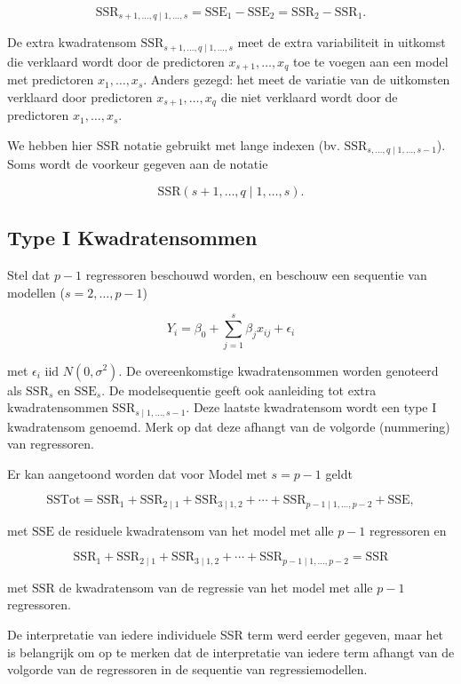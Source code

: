 \documentclass[
  dutch,
  letterpaper,
  12pt]{book}
\theoremstyle{definition}
\theoremstyle{definition}
\theoremstyle{definition}
\theoremstyle{remark}
\begin{document}
\[
  \text{SSR}_{s+1, \ldots, q\mid 1,\ldots, s} = \text{SSE}_1-\text{SSE}_2=\text{SSR}_2-\text{SSR}_1.
\]

De extra kwadratensom \(\text{SSR}_{s+1, \ldots, q\mid 1,\ldots, s}\)
meet de extra variabiliteit in uitkomst die verklaard wordt door de
predictoren \(x_{s+1}, \ldots, x_q\) toe te voegen aan een model met
predictoren \(x_1,\ldots, x_{s}\). Anders gezegd: het meet de variatie
van de uitkomsten verklaard door predictoren \(x_{s+1}, \ldots, x_q\)
die niet verklaard wordt door de predictoren \(x_1,\ldots, x_{s}\).

We hebben hier SSR notatie gebruikt met lange indexen (bv.
\(\text{SSR}_{s, \ldots, q\mid 1,\ldots, s-1}\)). Soms wordt de voorkeur
gegeven aan de notatie

\[
  \text{SSR}(s+1, \ldots, q\mid 1,\ldots, s).
\]

\subsection{Type I Kwadratensommen}\label{type-i-kwadratensommen}

Stel dat \(p-1\) regressoren beschouwd worden, en beschouw een sequentie
van modellen (\(s=2,\ldots, p-1\))

\[
Y_i = \beta_0 + \sum_{j=1}^{s} \beta_j x_{ij} + \epsilon_i
\]

met \(\epsilon_i\text{ iid } N(0,\sigma^{2})\). De overeenkomstige
kwadratensommen worden genoteerd als \(\text{SSR}_{s}\) en
\(\text{SSE}_{s}\). De modelsequentie geeft ook aanleiding tot extra
kwadratensommen \(\text{SSR}_{s\mid 1,\ldots, s-1}\). Deze laatste
kwadratensom wordt een type I kwadratensom genoemd. Merk op dat deze
afhangt van de volgorde (nummering) van regressoren.

Er kan aangetoond worden dat voor Model met \(s=p-1\) geldt

\[
 \text{SSTot} = \text{SSR}_1 + \text{SSR}_{2\mid 1} + \text{SSR}_{3\mid 1,2} + \cdots + \text{SSR}_{p-1\mid 1,\ldots, p-2} + \text{SSE},
\]

met \(\text{SSE}\) de residuele kwadratensom van het model met alle
\(p-1\) regressoren en

\[
  \text{SSR}_1 + \text{SSR}_{2\mid 1} + \text{SSR}_{3\mid 1,2} + \cdots + \text{SSR}_{p-1\mid 1,\ldots, p-2} = \text{SSR}
\]

met \(\text{SSR}\) de kwadratensom van de regressie van het model met
alle \(p-1\) regressoren.

De interpretatie van iedere individuele SSR term werd eerder gegeven,
maar het is belangrijk om op te merken dat de interpretatie van iedere
term afhangt van de volgorde van de regressoren in de sequentie van
regressiemodellen.
\end{document}
